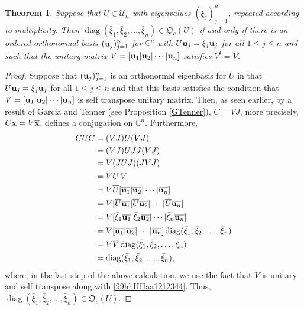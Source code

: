 \documentclass{dis}
\theoremstyle{plain}
\newtheorem{Theorem}[equation]{Theorem}
\theoremstyle{definition}
\def\C{\mathbb{C}}
\renewcommand{\leq}{\leqslant}
\renewcommand{\vec}[1]{{\bf #1}}
\newcommand{\0}{{\color{lightgray}0}}
\begin{document}
\begin{Theorem}\label{6771109999}
Suppose that $U \in \mathscr{U}_n$ with eigenvalues $(\xi_j)_{j = 1}^{n}$, repeated according to multiplicity. Then $\operatorname{diag}(\bar \xi_1, \bar \xi_2, \ldots, \bar \xi_n) 
\in \mathfrak{O}_c(U)$ if and only if there is an ordered orthonormal basis $(\vec{u}_j)_{j = 1}^{n}$ for $\C^n$ with $U \vec{u}_j = \xi_j \vec{u}_j$ for all $1 \leq j \leq n$ and such that  the unitary matrix $V = [\vec{u}_1 | \vec{u}_2| \cdots |\vec{u}_n]$
satisfies $V^{t} = V$. 
\end{Theorem}

\begin{proof}
Suppose that $(\vec{u}_j)_{j = 1}^{n}$ is an orthonormal eigenbasis for $U$ in that $U \vec{u}_j = \xi_j \vec{u}_j$ for all $1 \leq j \leq n$ and that  this basis satisfies the condition that $V = [\vec{u}_1 | \vec{u}_2| \cdots |\vec{u}_n]$ is self transpose unitary matrix. Then, as seen earlier,  by a result of Garcia and Tenner  \cite[Lemma 3.2]{MR2966041} (see Proposition \ref{GTenner}), $C = V J$, more precisely, $C \vec{x} = V \overline{\vec{x}}$, defines a conjugation on $\mathbb{C}^n$. Furthermore, 
\begin{align*}
CUC & = (V J) U (VJ)\\
& = (VJ) U JJ (VJ)\\
& = V (JUJ) (JVJ)\\
& = V \overline{U}\,\overline{V}\\
& = V \overline{U} [\overline{\vec{u}_1} | \overline{\vec{u}_2}| \cdots |\overline{\vec{u}_n}]\\
& = V  [\overline{U}\overline{\vec{u}_1} | \overline{U}\overline{\vec{u}_2}| \cdots |\overline{U}\overline{\vec{u}_n}]\\
& = V[\bar \xi_1 \overline{\vec{u}_1} | \bar \xi_2 \overline{\vec{u}_2}| \cdots | \bar \xi_n\overline{\vec{u}_n}]\\
& = V   [\overline{\vec{u}_1} | \overline{\vec{u}_2}| \cdots |\overline{\vec{u}_n}] \operatorname{diag}(\bar \xi_1, \bar \xi_2, \ldots, \bar \xi_n)\\
& = V \overline{V} \operatorname{diag}(\bar \xi_1, \bar \xi_2, \ldots, \bar \xi_n)\\
& = \operatorname{diag}(\bar \xi_1, \bar \xi_2, \ldots, \bar \xi_n),
\end{align*}
where, in the last step of the above calculation, we use the fact that $V$ is unitary and self transpose along with  \eqref{99hhHHaa1212344}. Thus, $\operatorname{diag}(\bar \xi_1, \bar \xi_2, \ldots, \bar \xi_n) \in \mathfrak{O}_c(U)$. 


\end{proof}
\end{document}
